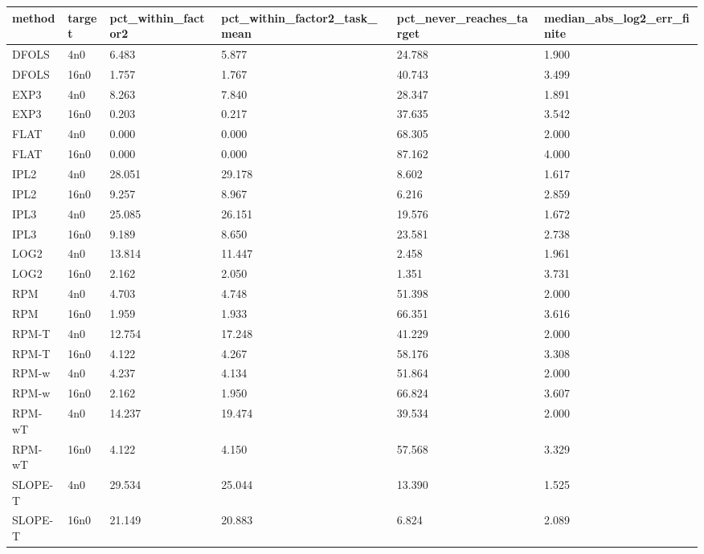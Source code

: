 \begin{tabular}{llllll}
\hline
method & target & pct\_within\_factor2 & pct\_within\_factor2\_task\_mean & pct\_never\_reaches\_target & median\_abs\_log2\_err\_finite \\
\hline
DFOLS & 4n0 & 6.483 & 5.877 & 24.788 & 1.900 \\
DFOLS & 16n0 & 1.757 & 1.767 & 40.743 & 3.499 \\
EXP3 & 4n0 & 8.263 & 7.840 & 28.347 & 1.891 \\
EXP3 & 16n0 & 0.203 & 0.217 & 37.635 & 3.542 \\
FLAT & 4n0 & 0.000 & 0.000 & 68.305 & 2.000 \\
FLAT & 16n0 & 0.000 & 0.000 & 87.162 & 4.000 \\
IPL2 & 4n0 & 28.051 & 29.178 & 8.602 & 1.617 \\
IPL2 & 16n0 & 9.257 & 8.967 & 6.216 & 2.859 \\
IPL3 & 4n0 & 25.085 & 26.151 & 19.576 & 1.672 \\
IPL3 & 16n0 & 9.189 & 8.650 & 23.581 & 2.738 \\
LOG2 & 4n0 & 13.814 & 11.447 & 2.458 & 1.961 \\
LOG2 & 16n0 & 2.162 & 2.050 & 1.351 & 3.731 \\
RPM & 4n0 & 4.703 & 4.748 & 51.398 & 2.000 \\
RPM & 16n0 & 1.959 & 1.933 & 66.351 & 3.616 \\
RPM-T & 4n0 & 12.754 & 17.248 & 41.229 & 2.000 \\
RPM-T & 16n0 & 4.122 & 4.267 & 58.176 & 3.308 \\
RPM-w & 4n0 & 4.237 & 4.134 & 51.864 & 2.000 \\
RPM-w & 16n0 & 2.162 & 1.950 & 66.824 & 3.607 \\
RPM-wT & 4n0 & 14.237 & 19.474 & 39.534 & 2.000 \\
RPM-wT & 16n0 & 4.122 & 4.150 & 57.568 & 3.329 \\
SLOPE-T & 4n0 & 29.534 & 25.044 & 13.390 & 1.525 \\
SLOPE-T & 16n0 & 21.149 & 20.883 & 6.824 & 2.089 \\
\hline
\end{tabular}
